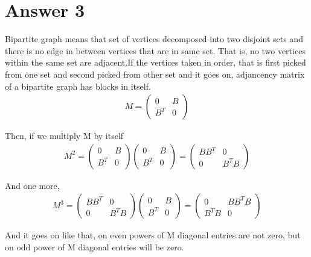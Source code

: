 \documentclass[11pt]{article}
\begin{document}
\section*{Answer 3}
Bipartite graph means that set of vertices decomposed into two disjoint sets and there is no edge in between vertices that are in same set. That is, no two vertices within the same set are adjacent.If the vertices taken in order, that is first picked from one set and second picked from other set and it goes on, adjancency matrix of a bipartite graph has blocks in itself. \\

\begin{align*}
M = \begin{pmatrix} 0 & B \\ B^T & 0 \end{pmatrix}
\end{align*}

Then, if we multiply M by itself \\

\begin{align*}
M^2=\begin{pmatrix}
0 & B \\ B^T & 0
\end{pmatrix}\begin{pmatrix}
0 & B \\ B^T & 0
\end{pmatrix}=\begin{pmatrix}
BB^T & 0 \\ 0 & B^TB
\end{pmatrix}
\end{align*}

And one more, \\

\begin{align*}
M^3=\begin{pmatrix}
BB^T & 0 \\ 0 & B^TB
\end{pmatrix}\begin{pmatrix}
0 & B \\ B^T & 0
\end{pmatrix}=\begin{pmatrix}
0 & BB^TB \\ B^TB & 0
\end{pmatrix}
\end{align*}

And it goes on like that, on even powers of M diagonal entries are not zero, but on odd power of M diagonal entries will be zero.  \\
\end{document}
